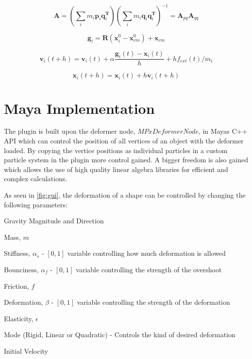    \begin{equation} \label{eq:A}
        \mathbf{A} = (\sum_i{m_i\mathbf{p}_i\mathbf{q}_i^{\mathbf{T}}})
        (\sum_i{m_i\mathbf{q}_i\mathbf{q}_i^{\mathbf{T}}})^{-1} 
        = \mathbf{A}_{pq}\mathbf{A}_{qq}
    \end{equation}

    \begin{equation}\label{eq:goal}
        \mathbf{g}_i = \mathbf{R}(\mathbf{x}^0_i - \mathbf{x}^0_{cm}) + \mathbf{x}_{cm}
    \end{equation}

    \begin{equation} \label{eq:vel}
        \mathbf{v}_i(t + h) = \mathbf{v}_i(t) + \alpha{\frac{\mathbf{g}_i(t) - \mathbf{x}_i(t)}{h}} + hf_{ext}(t)/m_i
    \end{equation}

    \begin{equation} \label{eq:pos}
        \mathbf{x}_i(t + h) = \mathbf{x}_i(t) + h\mathbf{v}_i(t + h) 
    \end{equation}


\section{Maya Implementation}

The plugin is built upon the deformer node, $MPxDeformerNode$, in Mayas C++ API which can control the position of all vertices of an object with the deformer loaded. By copying the vertice positions as individual particles in a custom particle system in the plugin more control gained. A bigger freedom is also gained which allows the use of high quality linear algebra libraries for efficient and complex calculations. 

As seen in \ref{fig:gui}, the deformation of a shape can be controlled by changing the following parameters:

\begin{myitemize} 
  \item Gravity Magnitude and Direction 
  \item Mass, $m$
  \item Stiffness, $\alpha_s$ - $[0,1]$ variable controlling how much deformation is allowed
  \item Bounciness, $\alpha_f$ - $[0,1]$ variable controlling the strength of the overshoot
  \item Friction, $f$
  \item Deformation, $\beta$ - $[0,1]$ variable controlling the strength of the deformation
  \item Elasticity, $\epsilon$
  \item Mode (Rigid, Linear or Quadratic) - Controls the kind of desired deformation 
  \item Initial Velocity 
\end{myitemize}

